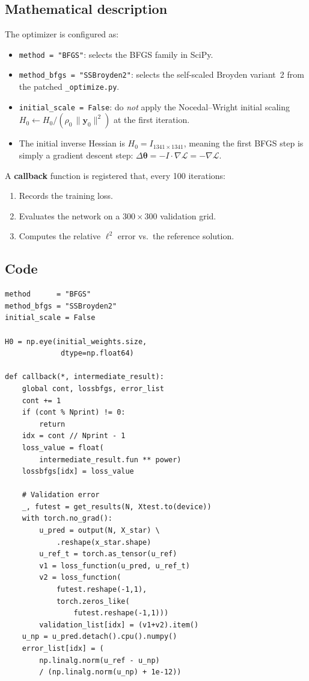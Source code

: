 \documentclass[11pt,a4paper]{article}
\begin{document}
\subsection*{Mathematical description}

The optimizer is configured as:
\begin{itemize}[nosep]
  \item \texttt{method = "BFGS"}: selects the BFGS family in SciPy.
  \item \texttt{method\_bfgs = "SSBroyden2"}: selects the self-scaled
        Broyden variant~2 from the patched \texttt{\_optimize.py}.
  \item \texttt{initial\_scale = False}: do \emph{not} apply the
        Nocedal--Wright initial scaling $H_0 \leftarrow H_0 /
        (\rho_0\,\|\bm{y}_0\|^2)$ at the first iteration.
  \item The initial inverse Hessian is $H_0 = I_{1341\times 1341}$,
        meaning the first BFGS step is simply a gradient descent step:
        $\Delta\bm\theta = -I\cdot\nabla\mathcal{L} = -\nabla\mathcal{L}$.
\end{itemize}

A \textbf{callback} function is registered that, every 100 iterations:
\begin{enumerate}[nosep]
  \item Records the training loss.
  \item Evaluates the network on a $300\times 300$ validation grid.
  \item Computes the relative $\ell^2$ error vs.\ the reference solution.
\end{enumerate}

\subsection*{Code}

\begin{lstlisting}
method      = "BFGS"
method_bfgs = "SSBroyden2"
initial_scale = False

H0 = np.eye(initial_weights.size,
             dtype=np.float64)

def callback(*, intermediate_result):
    global cont, lossbfgs, error_list
    cont += 1
    if (cont % Nprint) != 0:
        return
    idx = cont // Nprint - 1
    loss_value = float(
        intermediate_result.fun ** power)
    lossbfgs[idx] = loss_value

    # Validation error
    _, futest = get_results(N, Xtest.to(device))
    with torch.no_grad():
        u_pred = output(N, X_star) \
            .reshape(x_star.shape)
        u_ref_t = torch.as_tensor(u_ref)
        v1 = loss_function(u_pred, u_ref_t)
        v2 = loss_function(
            futest.reshape(-1,1),
            torch.zeros_like(
                futest.reshape(-1,1)))
        validation_list[idx] = (v1+v2).item()
    u_np = u_pred.detach().cpu().numpy()
    error_list[idx] = (
        np.linalg.norm(u_ref - u_np)
        / (np.linalg.norm(u_np) + 1e-12))
\end{lstlisting}
\end{document}
